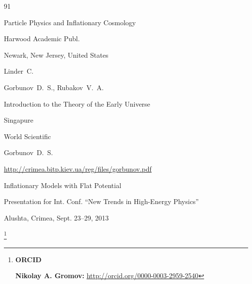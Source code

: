 \begin{thebibliography}{91}

\book Particle Physics and Inflationary Cosmology


\publ  Harwood Academic Publ.

\publaddr Newark, New Jersey, United States

\by Linder~C.









\by Gorbunov~D.~S., Rubakov~V.~A.

\book  Introduction to the Theory of the Early Universe

\publaddr Singapure

\publ World Scientific










\by Gorbunov~D.~S. 


\elink \url{http://crimea.bitp.kiev.ua/reg/files/gorbunov.pdf}

\preprint Inflationary Models with Flat Potential 

\preprintinfo Presentation for Int.  Conf. ``New Trends in High-Energy Physics''

\procinfo Alushta, Crimea, Sept. 23--29, 2013





\end{thebibliography}





\RuDate



\newpage



\makeentitle



\thanks{{\bf ORCID}





{\bf  Nikolay A. Gromov:} \url{http://orcid.org/0000-0003-2959-2540}



}



